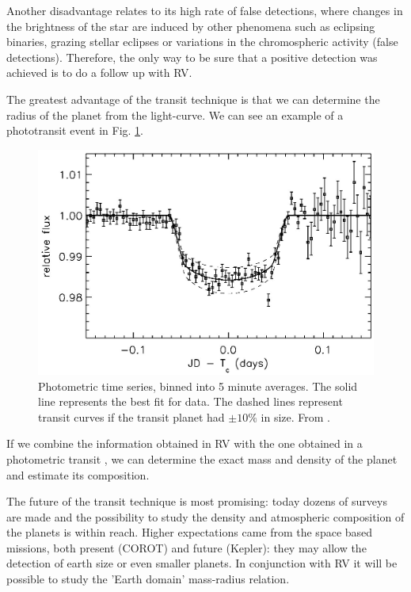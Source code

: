 \documentclass[dvips,12pt,a4paper]{report}
\begin{document}
Another disadvantage relates to its high rate of false detections, where changes in the brightness of the star are induced by other phenomena such as eclipsing binaries, grazing stellar eclipses or variations in the chromospheric activity (false detections). Therefore, the only way to be sure that a positive detection was achieved is to do a follow up with RV. 

The greatest advantage of the transit technique is that we can determine the radius of the planet from the light-curve. We can see an example of a phototransit event in Fig. \ref{photot}. 

\begin{figure}[h]
\centering
\includegraphics[trim=0cm 0.5cm 0cm 0.4cm,clip,height=5 cm]{pics/phototransit}
\caption[Example of a phototransit event]{Photometric time series, binned into 5 minute averages. The solid line represents the best fit for data. The dashed lines represent transit curves if the transit planet had $\pm10\%$ in size. From \citet{Charbonneau-2000}.}
\label{photot}
\end{figure}

If we combine the information obtained in RV with the one obtained in a photometric transit \citep{Charbonneau-2000}, we can determine the exact mass and density of the planet and estimate its composition.


The future of the transit technique is most promising: today dozens of surveys are made and the possibility to study the density and atmospheric composition of the planets is within reach. Higher expectations came from the space based missions, both present (COROT) and future (Kepler): they may allow the detection of earth size or even smaller planets. In conjunction with RV it will be possible to study the 'Earth domain' mass-radius relation.
\end{document}

